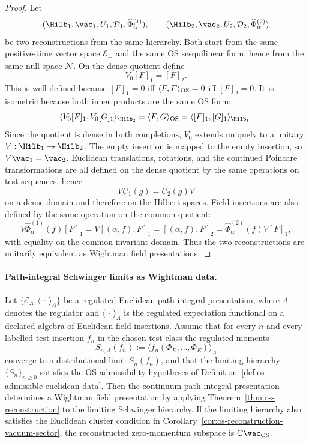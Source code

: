 \begin{proof}
Let
\[
  (\Hilb_1,\vac_1,U_1,\mathcal D_1,\widehat\Phi^{(1)}_\alpha),
  \qquad
  (\Hilb_2,\vac_2,U_2,\mathcal D_2,\widehat\Phi^{(2)}_\alpha)
\]
be two reconstructions from the same hierarchy.  Both start from the same
positive-time vector space \(\mathcal E_+\) and the same OS sesquilinear
form, hence from the same null space \(\mathcal N\).  On the dense quotient
define
\[
  V_0[F]_1=[F]_2 .
\]
This is well defined because \([F]_1=0\) iff
\(\langle F,F\rangle_{\rm OS}=0\) iff \([F]_2=0\).  It is isometric because
both inner products are the same OS form:
\[
  \langle V_0[F]_1,V_0[G]_1\rangle_{\Hilb_2}
  =
  \langle F,G\rangle_{\rm OS}
  =
  \langle [F]_1,[G]_1\rangle_{\Hilb_1}.
\]
Since the quotient is dense in both completions, \(V_0\) extends uniquely to a
unitary \(V:\Hilb_1\to\Hilb_2\).  The empty insertion is mapped to the empty
insertion, so \(V\vac_1=\vac_2\).  Euclidean translations, rotations, and the
continued Poincare transformations are all defined on the dense quotient by
the same operations on test sequences, hence
\[
  VU_1(g)=U_2(g)V
\]
on a dense domain and therefore on the Hilbert spaces.  Field insertions are
also defined by the same operation on the common quotient:
\[
  V\widehat\Phi^{(1)}_\alpha(f)[F]_1
  =
  V[(\alpha,f),F]_1
  =
  [(\alpha,f),F]_2
  =
  \widehat\Phi^{(2)}_\alpha(f)V[F]_1,
\]
with equality on the common invariant domain.  Thus the two reconstructions
are unitarily equivalent as Wightman field presentations.
\end{proof}

\paragraph{Path-integral Schwinger limits as Wightman data.}
Let \(\{\mathcal E_\Lambda,\langle\,\cdot\,\rangle_\Lambda\}\) be a regulated
Euclidean path-integral presentation, where \(\Lambda\) denotes the regulator
and \(\langle\,\cdot\,\rangle_\Lambda\) is the regulated expectation
functional on a declared algebra of Euclidean field insertions.  Assume that
for every \(n\) and every labelled test insertion \(f_n\) in the chosen test
class the regulated moments
\[
  S_{n,\Lambda}(f_n)
  :=
  \langle f_n(\Phi_E,\ldots,\Phi_E)\rangle_\Lambda
\]
converge to a distributional limit \(S_n(f_n)\), and that the limiting
hierarchy \(\{S_n\}_{n\ge0}\) satisfies the OS-admissibility hypotheses of
Definition~\ref{def:os-admissible-euclidean-data}.  Then the continuum path-integral
presentation determines a Wightman field presentation by applying
Theorem~\ref{thm:os-reconstruction} to the limiting Schwinger hierarchy.
If the limiting hierarchy also satisfies the Euclidean cluster condition in
Corollary~\ref{cor:os-reconstruction-vacuum-sector}, the reconstructed
zero-momentum subspace is \(\mathbb C\vac_{\rm OS}\).

